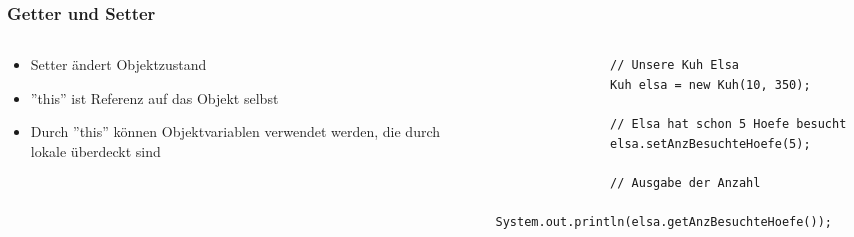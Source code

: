 \begin{frame}[fragile]
	\frametitle{Getter und Setter}
	\begin{columns}
		\begin{column}{0.5\textwidth}
			\small
			\begin{itemize}
			  \item Setter \"andert Objektzustand
			  \item ''this'' ist Referenz auf das Objekt selbst
			  \item Durch ''this'' k\"onnen Objektvariablen 
			  verwendet werden, die durch lokale \"uberdeckt sind
			\end{itemize}
		\end{column}
		\begin{column}{0.5\textwidth}
			\begin{lstlisting}
				// Unsere Kuh Elsa
				Kuh elsa = new Kuh(10, 350);
				
				// Elsa hat schon 5 Hoefe besucht
				elsa.setAnzBesuchteHoefe(5);
				
				// Ausgabe der Anzahl
				System.out.println(elsa.getAnzBesuchteHoefe());
				
			\end{lstlisting}
		\end{column}
	\end{columns}
\end{frame}

